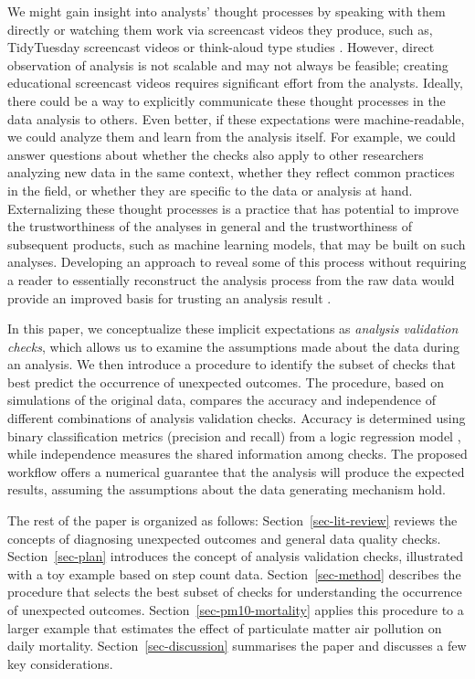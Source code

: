 \documentclass[
  12pt,
]{interact}
\begin{document}
We might gain insight into analysts' thought processes by speaking with
them directly or watching them work via screencast videos they produce,
such as, TidyTuesday screencast videos or think-aloud type studies
\citep[e.g.][]{gu2024data}. However, direct observation of analysis is
not scalable and may not always be feasible; creating educational
screencast videos requires significant effort from the analysts.
Ideally, there could be a way to explicitly communicate these thought
processes in the data analysis to others. Even better, if these
expectations were machine-readable, we could analyze them and learn from
the analysis itself. For example, we could answer questions about
whether the checks also apply to other researchers analyzing new data in
the same context, whether they reflect common practices in the field, or
whether they are specific to the data or analysis at hand. Externalizing
these thought processes is a practice that has potential to improve the
trustworthiness of the analyses \citep{yu2024veridical} in general and
the trustworthiness of subsequent products, such as machine learning
models, that may be built on such analyses. Developing an approach to
reveal some of this process without requiring a reader to essentially
reconstruct the analysis process from the raw data would provide an
improved basis for trusting an analysis result
\citep{peng2021reproducible}.

In this paper, we conceptualize these implicit expectations as
\emph{analysis validation checks}, which allows us to examine the
assumptions made about the data during an analysis. We then introduce a
procedure to identify the subset of checks that best predict the
occurrence of unexpected outcomes. The procedure, based on simulations
of the original data, compares the accuracy and independence of
different combinations of analysis validation checks. Accuracy is
determined using binary classification metrics (precision and recall)
from a logic regression model \citep{ruczinski_logic_2003}, while
independence measures the shared information among checks. The proposed
workflow offers a numerical guarantee that the analysis will produce the
expected results, assuming the assumptions about the data generating
mechanism hold.

The rest of the paper is organized as follows:
Section~\ref{sec-lit-review} reviews the concepts of diagnosing
unexpected outcomes and general data quality checks.
Section~\ref{sec-plan} introduces the concept of analysis validation
checks, illustrated with a toy example based on step count data.
Section~\ref{sec-method} describes the procedure that selects the best
subset of checks for understanding the occurrence of unexpected
outcomes. Section~\ref{sec-pm10-mortality} applies this procedure to a
larger example that estimates the effect of particulate matter air
pollution on daily mortality. Section~\ref{sec-discussion} summarises
the paper and discusses a few key considerations.
\end{document}
